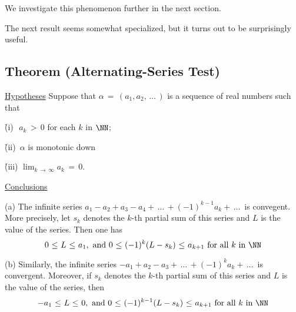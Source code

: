         We investigate this phenomenon further in the next section.

\V
\V



        The next result seems somewhat specialized, but it turns out to be surprisingly useful.

\V

        \subsection{\small{{\bf Theorem}} (Alternating-Series Test)}
        \label{ThmG30.120}

\V

        \underline{Hypotheses} Suppose that ${\alpha} \,=\, (a_{1},a_{2},\,{\ldots}\,)$ is a sequence of real numbers such that

        \h (i)\,\, $a_{k}\,>\,0$ for each $k$ in ${\NN}$;

        \h (ii)\, ${\alpha}$ is monotonic down

        \h (iii) $\lim_{k \,{\rightarrow}\, {\infty}} a_{k} \,=\, 0$.

\V

        \underline{Conclusions}

\V

        (a) The infinite series $a_{1}-a_{2}+a_{3}-a_{4} + \,{\ldots}\,+ (-1)^{k-1}a_{k} + \,{\ldots}\, $ is convegent.
    More precisely, let $s_{k}$ denotes the $k$-th partial sum of this series and $L$ is the value of the series. Then one has
        \begin{equation}
        \label{IneqG.80A}
        0\,\,{\leq}\,\,L\,\,{\leq}\,\,a_{1}, \mbox{ and } 0\,\,{\leq}\,\,(-1)^{k}(L-s_{k})\,\,{\leq}\,\,a_{k+1} \mbox{ for all $k$ in ${\NN}$}
        \end{equation}

\V

        (b) Similarly, the infinite series $-a_{1} + a_{2} - a_{3} + \,{\ldots}\, + (-1)^{k}a_{k} + \,{\ldots}\,$ is convergent.
    Moreover, if $s_{k}$ denotes the $k$-th partial sum of this series and $L$ is the value of the series, then
        \begin{equation}
        \label{IneqG.80B}
       -a_{1}\,\,{\leq}\,\,L\,\,{\leq}\,\,0, \mbox{ and } 0\,\,{\leq}\,\,(-1)^{k-1}(L-s_{k})\,\,{\leq}\,\,a_{k+1} \mbox{ for all $k$ in ${\NN}$}
        \end{equation}

\V


